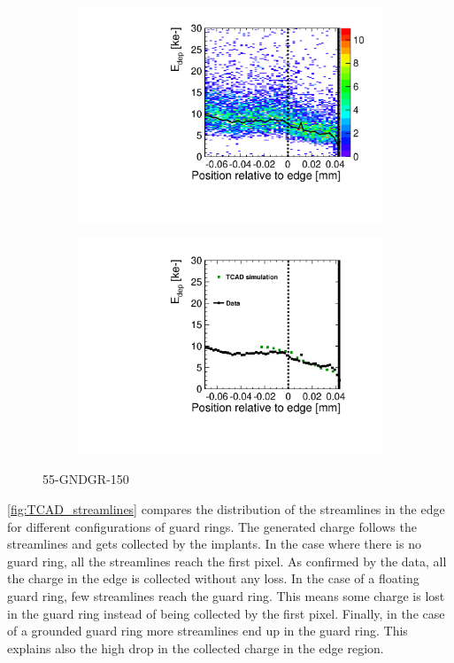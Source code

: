 \begin{figure}[htbp]
  \centering
  \begin{subfigure}[b]{0.5\textwidth}
    \includegraphics[width=\textwidth]{figures/ActiveEdge/TCAD_data_Edep_55_GNDGR_150.pdf}
    \caption{}
  \end{subfigure}\hfill
  \begin{subfigure}[b]{0.5\textwidth}
    \includegraphics[width=\textwidth]{figures/ActiveEdge/TCAD_data_55_GNDGR_150.pdf}
    \caption{}
  \end{subfigure}
  \caption{55-GNDGR-150}
  \label{fig:TCAD_vs_data_55_GNDGR_150}
\end{figure}

\cref{fig:TCAD_streamlines} compares the distribution of the
streamlines in the edge for different configurations of guard
rings. The generated charge follows the streamlines and gets collected
by the implants. In the case where there is no guard ring, all the
streamlines reach the first pixel. As confirmed by the data, all the
charge in the edge is collected without any loss. In the case of a
floating guard ring, few streamlines reach the guard ring. This means
some charge is lost in the guard ring instead of being collected by
the first pixel. Finally, in the case of a grounded guard ring more
streamlines end up in the guard ring. This explains also the high drop
in the collected charge in the edge region.

